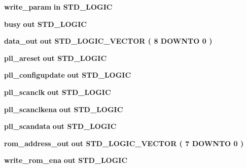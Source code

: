 \begin{DoxyCompactItemize}
\item 
{\bf write\+\_\+param}  {\bfseries {\bfseries \textcolor{keywordflow}{in}\textcolor{vhdlchar}{ }}} {\bfseries \textcolor{comment}{S\+T\+D\+\_\+\+L\+O\+G\+IC}\textcolor{vhdlchar}{ }} 
\item 
{\bf busy}  {\bfseries {\bfseries \textcolor{keywordflow}{out}\textcolor{vhdlchar}{ }}} {\bfseries \textcolor{comment}{S\+T\+D\+\_\+\+L\+O\+G\+IC}\textcolor{vhdlchar}{ }} 
\item 
{\bf data\+\_\+out}  {\bfseries {\bfseries \textcolor{keywordflow}{out}\textcolor{vhdlchar}{ }}} {\bfseries \textcolor{comment}{S\+T\+D\+\_\+\+L\+O\+G\+I\+C\+\_\+\+V\+E\+C\+T\+OR}\textcolor{vhdlchar}{ }\textcolor{vhdlchar}{(}\textcolor{vhdlchar}{ }\textcolor{vhdlchar}{ } \textcolor{vhdldigit}{8} \textcolor{vhdlchar}{ }\textcolor{keywordflow}{D\+O\+W\+N\+TO}\textcolor{vhdlchar}{ }\textcolor{vhdlchar}{ } \textcolor{vhdldigit}{0} \textcolor{vhdlchar}{ }\textcolor{vhdlchar}{)}\textcolor{vhdlchar}{ }} 
\item 
{\bf pll\+\_\+areset}  {\bfseries {\bfseries \textcolor{keywordflow}{out}\textcolor{vhdlchar}{ }}} {\bfseries \textcolor{comment}{S\+T\+D\+\_\+\+L\+O\+G\+IC}\textcolor{vhdlchar}{ }} 
\item 
{\bf pll\+\_\+configupdate}  {\bfseries {\bfseries \textcolor{keywordflow}{out}\textcolor{vhdlchar}{ }}} {\bfseries \textcolor{comment}{S\+T\+D\+\_\+\+L\+O\+G\+IC}\textcolor{vhdlchar}{ }} 
\item 
{\bf pll\+\_\+scanclk}  {\bfseries {\bfseries \textcolor{keywordflow}{out}\textcolor{vhdlchar}{ }}} {\bfseries \textcolor{comment}{S\+T\+D\+\_\+\+L\+O\+G\+IC}\textcolor{vhdlchar}{ }} 
\item 
{\bf pll\+\_\+scanclkena}  {\bfseries {\bfseries \textcolor{keywordflow}{out}\textcolor{vhdlchar}{ }}} {\bfseries \textcolor{comment}{S\+T\+D\+\_\+\+L\+O\+G\+IC}\textcolor{vhdlchar}{ }} 
\item 
{\bf pll\+\_\+scandata}  {\bfseries {\bfseries \textcolor{keywordflow}{out}\textcolor{vhdlchar}{ }}} {\bfseries \textcolor{comment}{S\+T\+D\+\_\+\+L\+O\+G\+IC}\textcolor{vhdlchar}{ }} 
\item 
{\bf rom\+\_\+address\+\_\+out}  {\bfseries {\bfseries \textcolor{keywordflow}{out}\textcolor{vhdlchar}{ }}} {\bfseries \textcolor{comment}{S\+T\+D\+\_\+\+L\+O\+G\+I\+C\+\_\+\+V\+E\+C\+T\+OR}\textcolor{vhdlchar}{ }\textcolor{vhdlchar}{(}\textcolor{vhdlchar}{ }\textcolor{vhdlchar}{ } \textcolor{vhdldigit}{7} \textcolor{vhdlchar}{ }\textcolor{keywordflow}{D\+O\+W\+N\+TO}\textcolor{vhdlchar}{ }\textcolor{vhdlchar}{ } \textcolor{vhdldigit}{0} \textcolor{vhdlchar}{ }\textcolor{vhdlchar}{)}\textcolor{vhdlchar}{ }} 
\item 
{\bf write\+\_\+rom\+\_\+ena}  {\bfseries {\bfseries \textcolor{keywordflow}{out}\textcolor{vhdlchar}{ }}} {\bfseries \textcolor{comment}{S\+T\+D\+\_\+\+L\+O\+G\+IC}\textcolor{vhdlchar}{ }} 
\end{DoxyCompactItemize}


